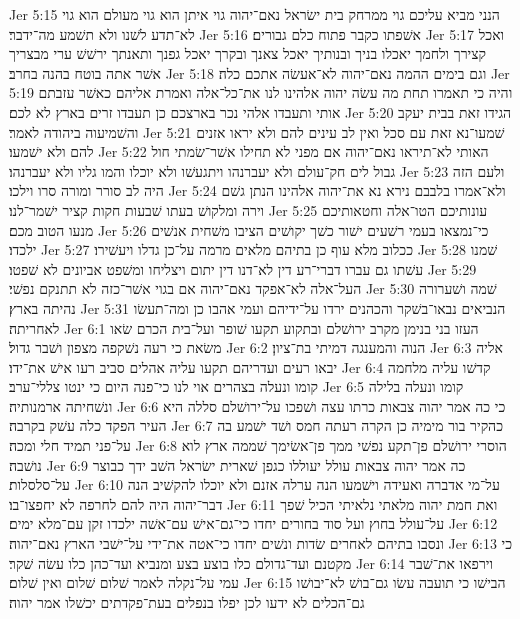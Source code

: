 Jer 5:15  הנני מביא עליכם גוי ממרחק בית ישׂראל נאם־יהוה גוי איתן הוא גוי מעולם הוא גוי לא־תדע לשׁנו ולא תשׁמע מה־ידבר׃
Jer 5:16  אשׁפתו כקבר פתוח כלם גבורים׃
Jer 5:17  ואכל קצירך ולחמך יאכלו בניך ובנותיך יאכל צאנך ובקרך יאכל גפנך ותאנתך ירשׁשׁ ערי מבצריך אשׁר אתה בוטח בהנה בחרב׃
Jer 5:18  וגם בימים ההמה נאם־יהוה לא־אעשׂה אתכם כלה׃
Jer 5:19  והיה כי תאמרו תחת מה עשׂה יהוה אלהינו לנו את־כל־אלה ואמרת אליהם כאשׁר עזבתם אותי ותעבדו אלהי נכר בארצכם כן תעבדו זרים בארץ לא לכם׃
Jer 5:20  הגידו זאת בבית יעקב והשׁמיעוה ביהודה לאמר׃
Jer 5:21  שׁמעו־נא זאת עם סכל ואין לב עינים להם ולא יראו אזנים להם ולא ישׁמעו׃
Jer 5:22  האותי לא־תיראו נאם־יהוה אם מפני לא תחילו אשׁר־שׂמתי חול גבול לים חק־עולם ולא יעברנהו ויתגעשׁו ולא יוכלו והמו גליו ולא יעברנהו׃
Jer 5:23  ולעם הזה היה לב סורר ומורה סרו וילכו׃
Jer 5:24  ולא־אמרו בלבבם נירא נא את־יהוה אלהינו הנתן גשׁם וירה ומלקושׁ בעתו שׁבעות חקות קציר ישׁמר־לנו׃
Jer 5:25  עונותיכם הטו־אלה וחטאותיכם מנעו הטוב מכם׃
Jer 5:26  כי־נמצאו בעמי רשׁעים ישׁור כשׁך יקושׁים הציבו משׁחית אנשׁים ילכדו׃
Jer 5:27  ככלוב מלא עוף כן בתיהם מלאים מרמה על־כן גדלו ויעשׁירו׃
Jer 5:28  שׁמנו עשׁתו גם עברו דברי־רע דין לא־דנו דין יתום ויצליחו ומשׁפט אביונים לא שׁפטו׃
Jer 5:29  העל־אלה לא־אפקד נאם־יהוה אם בגוי אשׁר־כזה לא תתנקם נפשׁי׃
Jer 5:30  שׁמה ושׁערורה נהיתה בארץ׃
Jer 5:31  הנביאים נבאו־בשׁקר והכהנים ירדו על־ידיהם ועמי אהבו כן ומה־תעשׂו לאחריתה׃
Jer 6:1  העזו בני בנימן מקרב ירושׁלם ובתקוע תקעו שׁופר ועל־בית הכרם שׂאו משׂאת כי רעה נשׁקפה מצפון ושׁבר גדול׃
Jer 6:2  הנוה והמענגה דמיתי בת־ציון׃
Jer 6:3  אליה יבאו רעים ועדריהם תקעו עליה אהלים סביב רעו אישׁ את־ידו׃
Jer 6:4  קדשׁו עליה מלחמה קומו ונעלה בצהרים אוי לנו כי־פנה היום כי ינטו צללי־ערב׃
Jer 6:5  קומו ונעלה בלילה ונשׁחיתה ארמנותיה׃
Jer 6:6  כי כה אמר יהוה צבאות כרתו עצה ושׁפכו על־ירושׁלם סללה היא העיר הפקד כלה עשׁק בקרבה׃
Jer 6:7  כהקיר בור מימיה כן הקרה רעתה חמס ושׁד ישׁמע בה על־פני תמיד חלי ומכה׃
Jer 6:8  הוסרי ירושׁלם פן־תקע נפשׁי ממך פן־אשׂימך שׁממה ארץ לוא נושׁבה׃
Jer 6:9  כה אמר יהוה צבאות עולל יעוללו כגפן שׁארית ישׂראל השׁב ידך כבוצר על־סלסלות׃
Jer 6:10  על־מי אדברה ואעידה וישׁמעו הנה ערלה אזנם ולא יוכלו להקשׁיב הנה דבר־יהוה היה להם לחרפה לא יחפצו־בו׃
Jer 6:11  ואת חמת יהוה מלאתי נלאיתי הכיל שׁפך על־עולל בחוץ ועל סוד בחורים יחדו כי־גם־אישׁ עם־אשׁה ילכדו זקן עם־מלא ימים׃
Jer 6:12  ונסבו בתיהם לאחרים שׂדות ונשׁים יחדו כי־אטה את־ידי על־ישׁבי הארץ נאם־יהוה׃
Jer 6:13  כי מקטנם ועד־גדולם כלו בוצע בצע ומנביא ועד־כהן כלו עשׂה שׁקר׃
Jer 6:14  וירפאו את־שׁבר עמי על־נקלה לאמר שׁלום שׁלום ואין שׁלום׃
Jer 6:15  הבישׁו כי תועבה עשׂו גם־בושׁ לא־יבושׁו גם־הכלים לא ידעו לכן יפלו בנפלים בעת־פקדתים יכשׁלו אמר יהוה׃
